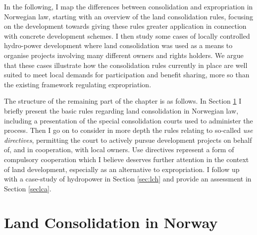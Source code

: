 {In the following, I map the differences between consolidation and expropriation in Norwegian law, starting with an overview of the land consolidation rules, focusing on the development towards giving these rules greater application in connection with concrete development schemes. I then study some cases of locally controlled hydro-power development where land consolidation was used as a means to organise projects involving many different owners and rights holders. We argue that these cases illustrate how the consolidation rules currently in place are well suited to meet local demands for participation and benefit sharing, more so than the existing framework regulating expropriation.

The structure of the remaining part of the chapter is as follows. In Section \ref{sec:lcc} I briefly present the basic rules regarding land consolidation in Norwegian law, including a presentation of the special consolidation courts used to administer the process. Then I go on to consider in more depth the rules relating to so-called \emph{use directives}, permitting the court to actively pursue development projects on behalf of, and in cooperation, with local owners. Use directives represent a form of compulsory cooperation which I believe deserves further attention in the context of land development, especially as an alternative to expropriation. I follow up with a case-study of hydropower in Section \ref{sec:lch} and provide an assessment in Section \ref{seclca}. }

\section{Land Consolidation in Norway}\label{sec:lcc}

